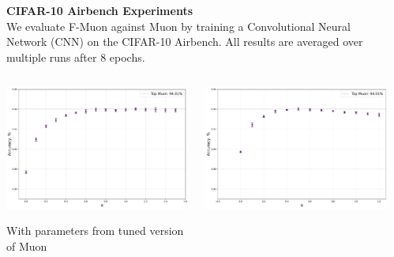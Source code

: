 \documentclass[fontsize=10pt]{beamer}
\begin{document}
\begin{frame}[fragile]
\begin{columns}[T]
\begin{column}{0.30\textwidth}
\end{column}
\hspace{0.02\textwidth}%

\begin{column}{0.30\textwidth}
\setlength{\parskip}{0.7em}
\setlength{\parindent}{0pt}
\Large

\textbf{\Huge\color{Zen}CIFAR-10 Airbench Experiments}\\[0.3em]

We evaluate F-Muon against Muon by training a Convolutional Neural Network (CNN) on the CIFAR-10 Airbench. All results are averaged over multiple runs after 8 epochs.

\begin{columns}[T,totalwidth=\textwidth]
      \begin{column}{0.48\textwidth}
        \includegraphics[width=\linewidth]{muon_tuned_diff_alpha.pdf}

        {\centering With parameters from tuned version of Muon\par}
      \end{column}
      \begin{column}{0.48\textwidth}
        \includegraphics[width=\linewidth]{fmuon_tuned_diff_alpha.pdf}


\end{column}
\end{columns}
\end{column}
\end{columns}
\end{frame}
\end{document}

